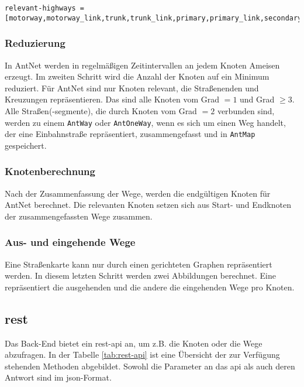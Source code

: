 \begin{lstlisting}
relevant-highways = [motorway,motorway_link,trunk,trunk_link,primary,primary_link,secondary,secondary_link,tertiary]
\end{lstlisting}

\subsubsection{Reduzierung}
\label{sec:reduzierung}

In AntNet werden in regelmäßigen Zeitintervallen an jedem Knoten Ameisen erzeugt.
Im zweiten Schritt wird die Anzahl der Knoten auf ein Minimum reduziert.
Für AntNet sind nur Knoten relevant, die Straßenenden und Kreuzungen repräsentieren.
Das sind alle Knoten vom Grad $= 1$ und Grad $\geq 3$.
Alle Straßen(-segmente), die durch Knoten vom Grad $= 2$ verbunden sind, werden zu einem \texttt{AntWay} oder \texttt{AntOneWay}, wenn es sich um einen Weg handelt, der eine Einbahnstraße repräsentiert, zusammengefasst und in \texttt{AntMap} gespeichert.

\subsubsection{Knotenberechnung}
\label{sec:knotenberechnung}

Nach der Zusammenfassung der Wege, werden die endgültigen Knoten für AntNet berechnet.
Die relevanten Knoten setzen sich aus Start- und Endknoten der zusammengefassten Wege zusammen.

\subsubsection{Aus- und eingehende Wege}
\label{sec:aus-und-eingehende-wege}

Eine Straßenkarte kann nur durch einen gerichteten Graphen repräsentiert werden.
In diesem letzten Schritt werden zwei Abbildungen berechnet.
Eine repräsentiert die ausgehenden und die andere die eingehenden Wege pro Knoten.

\subsection{\acs*{rest}}
\label{sec:rest}

Das Back-End bietet ein \ac{rest}-\ac{api} an, um z.B. die Knoten oder die Wege abzufragen.
In der Tabelle \ref{tab:rest-api} ist eine Übersicht der zur Verfügung stehenden Methoden abgebildet.
Sowohl die Parameter an das \ac{api} als auch deren Antwort sind im \ac{json}-Format.

